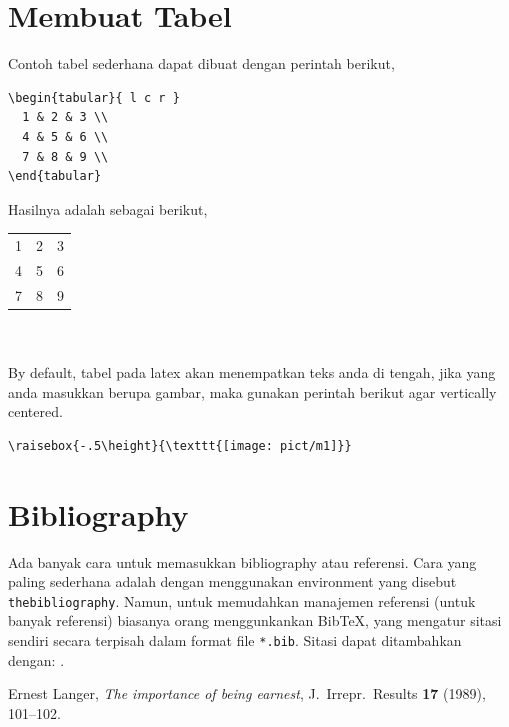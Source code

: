 \documentclass[12pt]{article}
\begin{document}
\section{Membuat Tabel}
Contoh tabel sederhana dapat dibuat dengan perintah berikut,
\begin{verbatim}
\begin{tabular}{ l c r }
  1 & 2 & 3 \\
  4 & 5 & 6 \\
  7 & 8 & 9 \\
\end{tabular}
\end{verbatim}
Hasilnya adalah sebagai berikut,\\
\begin{tabular}{ l c r }
  1 & 2 & 3 \\
  4 & 5 & 6 \\
  7 & 8 & 9 \\
\end{tabular}
\\
\\
By default, tabel pada latex akan menempatkan teks anda di tengah, jika yang anda masukkan berupa gambar, maka gunakan perintah berikut agar vertically centered.
\begin{verbatim}
\raisebox{-.5\height}{\texttt{[image: pict/m1]}}
\end{verbatim}

\section{Bibliography}
Ada banyak cara untuk memasukkan bibliography atau referensi. Cara yang paling sederhana adalah dengan menggunakan environment yang disebut \texttt{thebibliography}.  Namun, untuk memudahkan manajemen referensi (untuk banyak referensi) biasanya orang menggunkankan BibTeX, yang mengatur sitasi sendiri secara terpisah dalam format file \texttt{*.bib}.  Sitasi dapat ditambahkan dengan: \cite{langer1989}.

\begin{thebibliography}{9}

 Ernest Langer, \textit{The importance of being earnest}, J.\ Irrepr.\ Results \textbf{17} (1989), 101--102.

\end{thebibliography}
\end{document}
